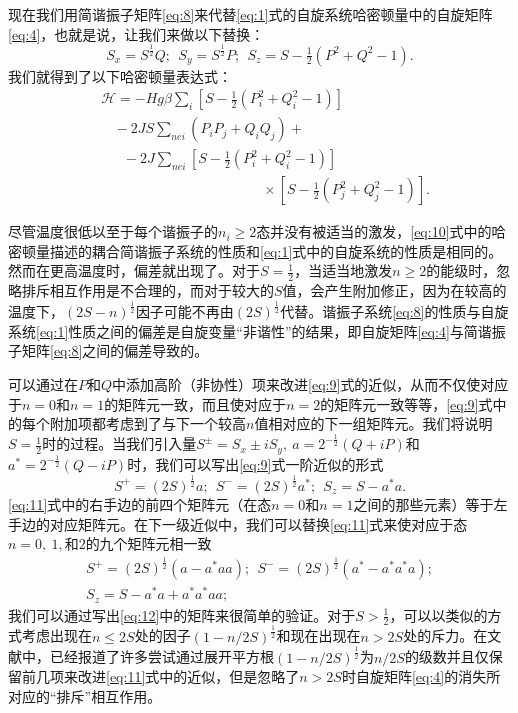 \documentclass{article}
\begin{document}
现在我们用简谐振子矩阵\eqref{eq:8}来代替\eqref{eq:1}式的自旋系统哈密顿量中的自旋矩阵\eqref{eq:4}，也就是说，让我们来做以下替换：
\begin{equation} \label{eq:9}
S_x=S^{\frac{1}{2}}Q;~~S_y=S^{\frac{1}{2}}P;~~S_z=S-\tfrac{1}{2}(P^2+Q^2-1).
\end{equation}
我们就得到了以下哈密顿量表达式：
\begin{eqnarray} \label{eq:10}
&\mathcal{H}=-Hg\beta\sum\nolimits_i[S-\tfrac{1}{2}(P_i^2+Q_i^2-1)]\nonumber\\
&\phantom{~~~~}-2JS\sum\nolimits_{\mathit{nei}}(P_iP_j+Q_iQ_j)+\nonumber\\
&\phantom{~~~~~~~}-2J\sum\nolimits_{nei}[S-\tfrac{1}{2}(P_i^2+Q_i^2-1)]\nonumber\\
&\phantom{~~~~~~~~~~~~~~~~~~~~~~~~~~~~~~~~~~~~~~~~~~~~~~~~~~~~}\times[S-\tfrac{1}{2}(P_j^2+Q_j^2-1)].
\end{eqnarray}

尽管温度很低以至于每个谐振子的$n_i\geqslant 2$态并没有被适当的激发，\eqref{eq:10}式中的哈密顿量描述的耦合简谐振子系统的性质和\eqref{eq:1}式中的自旋系统的性质是相同的。然而在更高温度时，偏差就出现了。对于$S=\frac{1}{2}$，当适当地激发$n\geqslant 2$的能级时，忽略排斥相互作用是不合理的，而对于较大的$S$值，会产生附加修正，因为在较高的温度下，$(2S-n)^\frac{1}{2}$因子可能不再由$(2S)^\frac{1}{2}$代替。谐振子系统\eqref{eq:8}的性质与自旋系统\eqref{eq:1}性质之间的偏差是自旋变量“非谐性”的结果，即自旋矩阵\eqref{eq:4}与简谐振子矩阵\eqref{eq:8}之间的偏差导致的。

可以通过在$P$和$Q$中添加高阶（非协性）项来改进\eqref{eq:9}式的近似，从而不仅使对应于$n=0$和$n=1$的矩阵元一致，而且使对应于$n=2$的矩阵元一致等等，\eqref{eq:9}式中的每个附加项都考虑到了与下一个较高$n$值相对应的下一组矩阵元。我们将说明$S=\frac{1}{2}$时的过程。当我们引入量$S^\pm=S_x\pm iS_y,~a=2^{-\frac{1}{2}}(Q+iP)$和$a^*=2^{-\frac{1}{2}}(Q-iP)$时，我们可以写出\eqref{eq:9}式一阶近似的形式
\begin{equation} \label{eq:11}
S^+=(2S)^{\frac{1}{2}}a;~~S^-=(2S)^{\frac{1}{2}}a^*;~~S_z=S-a^*a.
\end{equation}
\eqref{eq:11}式中的右手边的前四个矩阵元（在态$n=0$和$n=1$之间的那些元素）等于左手边的对应矩阵元。在下一级近似中，我们可以替换\eqref{eq:11}式来使对应于态$n=0,~1,$和$2$的九个矩阵元相一致
\begin{equation} \label{eq:12}
\begin{array}{c}
S^+=(2S)^{\frac{1}{2}}(a-a^*aa);~~S^-=(2S)^{\frac{1}{2}}(a^*-a^*a^*a);\\
S_z=S-a^*a+a^*a^*aa;
\end{array}
\end{equation}
我们可以通过写出\eqref{eq:12}中的矩阵来很简单的验证。对于$S>\frac{1}{2}$，可以以类似的方式考虑出现在$n\leqslant 2S$处的因子$(1-n/2S)^\frac{1}{2}$和现在出现在$n>2S$处的斥力。在文献中，已经报道了许多尝试通过展开平方根$(1-n/2S)^\frac{1}{2}$为$n/2S$的级数并且仅保留前几项来改进\eqref{eq:11}式中的近似，但是忽略了$n>2S$时自旋矩阵\eqref{eq:4}的消失所对应的“排斥”相互作用。
\end{document}
